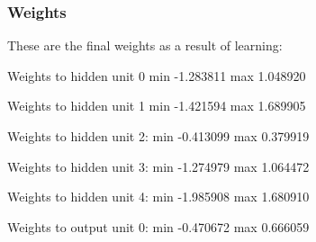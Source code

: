 \documentclass[a4paper]{article}
\providecommand{\psfig}[1]{}
\begin{document}
\clearpage

\subsubsection{Weights}

These are the final weights as a result of learning:



Weights to hidden unit 0 min -1.283811 max 1.048920

\centerline{\psfig{figure=/rsunq/vision/stephene/dispruns/testthencheck/gauss600.40x40/hidden0.ps,width=200pt,angle=90}}


Weights to hidden unit 1 min -1.421594 max 1.689905

\centerline{\psfig{figure=/rsunq/vision/stephene/dispruns/testthencheck/gauss600.40x40/hidden1.ps,width=200pt,angle=90}}


Weights to hidden unit 2: min -0.413099 max 0.379919

\centerline{\psfig{figure=/rsunq/vision/stephene/dispruns/testthencheck/gauss600.40x40/hidden2.ps,width=200pt,angle=90}}


Weights to hidden unit 3: min -1.274979 max 1.064472

\centerline{\psfig{figure=/rsunq/vision/stephene/dispruns/testthencheck/gauss600.40x40/hidden3.ps,width=200pt,angle=90}}


Weights to hidden unit 4: min -1.985908 max 1.680910

\centerline{\psfig{figure=/rsunq/vision/stephene/dispruns/testthencheck/gauss600.40x40/hidden4.ps,width=200pt,angle=90}}

\clearpage

Weights to output  unit 0: min -0.470672 max 0.666059

\centerline{\psfig{figure=/rsunq/vision/stephene/dispruns/testthencheck/gauss600.40x40/op0.ps,width=200pt}}



%
%
\end{document}
